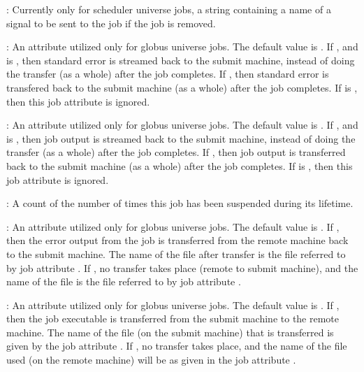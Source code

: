 \begin{description}
\item[\AdAttr{RemoveKillSig}] :   Currently only for scheduler universe jobs,
a string containing a name of
a signal to be sent to the job if the job is removed.

\item[\AdAttr{StreamErr}] :  
An attribute utilized only for globus universe jobs.
The default value is .
If , and  is , then 
standard error is streamed back to the submit machine, instead
of doing the transfer (as a whole) after the job completes.
If , then
standard error is transfered back to the submit machine
(as a whole) after the job completes.
If  is , then this job attribute is ignored.

\item[\AdAttr{StreamOut}] :  
An attribute utilized only for globus universe jobs.
The default value is .
If , and  is , then 
job output is streamed back to the submit machine, instead
of doing the transfer (as a whole) after the job completes.
If , then
job output is transferred back to the submit machine
(as a whole) after the job completes.
If  is , then this job attribute is ignored.

\item[\AdAttr{TotalSuspensions}] : A count of the number of times this job
has been suspended during its lifetime.

\item[\AdAttr{TransferErr}] :  
An attribute utilized only for globus universe jobs.
The default value is .
If , then the error output from the job
is transferred from the remote machine back to the submit machine.
The name of the file after transfer is the file referred to
by job attribute .
If , no transfer takes place (remote to submit machine),
and the name of the file is the file referred to
by job attribute .

\item[\AdAttr{TransferExecutable}] :  
An attribute utilized only for globus universe jobs.
The default value is .
If , then the job executable is transferred from the submit
machine to the remote machine.
The name of the file (on the submit machine)
that is transferred is given by the
job attribute .
If , no transfer takes place, and
the name of the file used (on the remote machine) will be as
given in the job attribute .


\end{description}
